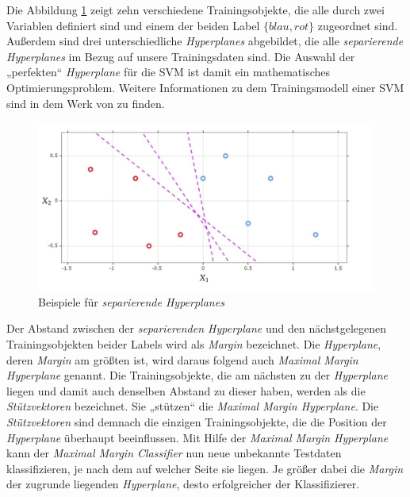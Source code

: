 Die Abbildung \ref{fig:separating_hyperplanes} zeigt zehn verschiedene Trainingsobjekte, die alle durch zwei Variablen definiert sind und
einem der beiden Label $\{blau, rot\}$ zugeordnet sind. Außerdem sind drei unterschiedliche \textit{Hyperplanes} abgebildet, die alle 
\textit{separierende Hyperplanes} im Bezug auf unsere Trainingsdaten sind. Die Auswahl der „perfekten“ \textit{Hyperplane} für die SVM ist
damit ein mathematisches Optimierungsproblem. 
Weitere Informationen zu dem Trainingsmodell einer SVM sind in dem Werk von \citeauthor{suthaharan_2015} zu finden.\cite[S. 210ff.]{suthaharan_2015}
\begin{figure}[H]
	\centering
	\includegraphics[width=\imgMed]{images/theory/separating_hyperplanes.jpg}
	\caption{Beispiele für \textit{separierende Hyperplanes}} 
	\label{fig:separating_hyperplanes}
\end{figure}
Der Abstand zwischen der \textit{separierenden Hyperplane} und den nächstgelegenen Trainingsobjekten beider Labels
wird als \textit{Margin} bezeichnet. Die \textit{Hyperplane}, deren \textit{Margin} am größten ist,
wird daraus folgend auch \textit{Maximal Margin Hyperplane} genannt.
Die Trainingsobjekte, die am nächsten zu der \textit{Hyperplane} liegen und damit auch denselben Abstand zu dieser haben,
werden als die \textit{Stützvektoren} bezeichnet. Sie „stützen“ die \textit{Maximal Margin Hyperplane}.
Die \textit{Stützvektoren} sind demnach die einzigen Trainingsobjekte, die die Position der \textit{Hyperplane} überhaupt beeinflussen.\cite[S. 341]{james_2013}
Mit Hilfe der \textit{Maximal Margin Hyperplane} kann der 
\textit{Maximal Margin Classifier} nun neue unbekannte Testdaten klassifizieren, je nach dem auf welcher Seite sie liegen.
Je größer dabei die \textit{Margin} der zugrunde liegenden \textit{Hyperplane}, desto erfolgreicher der Klassifizierer.\cite[S. 1566]{noble_2006}

